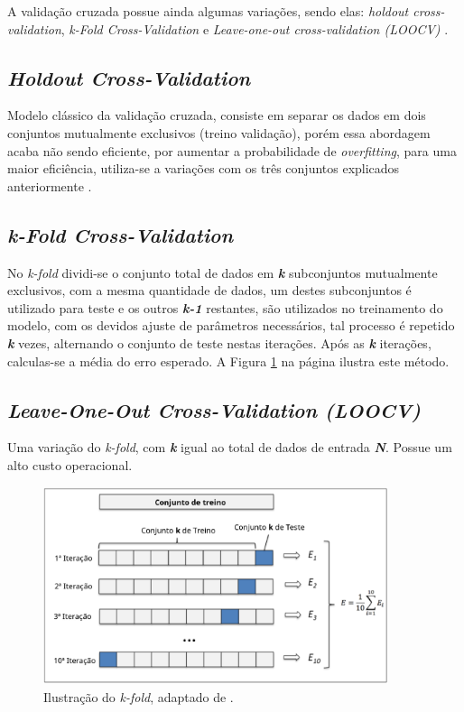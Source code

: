 A validação cruzada possue ainda algumas variações, sendo elas: \textit{holdout cross-validation}, \textit{k-Fold Cross-Validation} e \textit{Leave-one-out cross-validation (LOOCV)} \cite{james2013introduction}.


\subsection{\textit{Holdout Cross-Validation}}
Modelo clássico da validação cruzada, consiste em separar os dados em dois conjuntos mutualmente exclusivos (treino validação), porém essa abordagem acaba não sendo eficiente, por aumentar a probabilidade de \textit{overfitting}, para uma maior eficiência, utiliza-se a variações com os três conjuntos explicados anteriormente \cite{raschka2015python}.

\subsection{\textit{k-Fold Cross-Validation}}
No \textit{k-fold} dividi-se o conjunto total de dados em \textbf{\textit{k}} subconjuntos mutualmente exclusivos, com a mesma quantidade de dados, um destes subconjuntos é utilizado para teste e os outros \textbf{\textit{k-1}} restantes, são utilizados no treinamento do modelo, com os devidos ajuste de parâmetros necessários, tal processo é repetido \textbf{\textit{k}} vezes, alternando o conjunto de teste nestas iterações. Após as \textbf{\textit{k}} iterações, calculas-se a média do erro esperado. A Figura \ref{kfold} na página \pageref{kfold} ilustra este método.

\subsection{\textit{Leave-One-Out Cross-Validation (LOOCV)}} Uma variação do \textit{k-fold}, com \textbf{\textit{k}} igual ao total de dados de entrada \textbf{\textit{N}}. Possue um alto custo operacional.

\begin{figure}[!htb]
    \centering
     \includegraphics[width=0.9\textwidth]{figuras/kfold.eps}
     \caption{Ilustração do \textit{k-fold}, adaptado de .}
     \label{kfold}
\end{figure}


